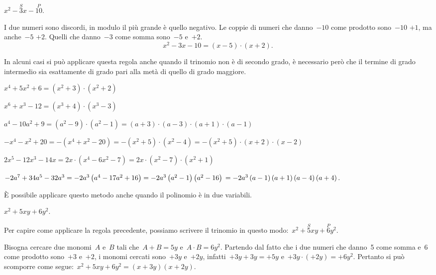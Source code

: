 \begin{esempio}
 $x^{2}-\overset{S}{3}x-\overset{P}{10}.$

I due numeri sono discordi, in modulo il più grande è quello
negativo. Le coppie di numeri che danno~$-10$ come prodotto sono~$-10$ $+1$,
ma anche~$-5$ $+2$. Quelli che danno~$-3$ come somma sono~$-5$ e~$+2$.
\[x^{2}-3x-10=\left(x-5\right)\cdot \left(x+2\right).\]
\end{esempio}

\begin{esempio}
 In alcuni casi si può applicare questa regola anche quando il trinomio
non è di secondo grado, è necessario però che il termine di grado
intermedio sia esattamente di grado pari alla metà di quello di grado
maggiore.

\begin{itemize*}
\item $x^{4}+5x^{2}+6=\left(x^{2}+3\right)\cdot \left(x^{2}+2\right)$
\item $x^{6}+x^{3}-12=\left(x^{3}+4\right)\cdot \left(x^{3}-3\right)$
\item $a^{4}-10a^{2}+9=\left(a^{2}-9\right)\cdot\left(a^{2}-1\right)=
       \left(a+3\right)\cdot \left(a-3\right)\cdot 
       \left(a+1\right)\cdot\left(a-1\right)$
\item $-x^{4}-x^{2}+20=-\left(x^{4}+x^{2}-20\right)=
       -\left(x^{2}+5\right)\cdot\left(x^{2}-4\right)=
       -\left(x^{2}+5\right)\cdot\left(x+2\right)\cdot \left(x-2\right)$
\item $2x^{5}-12x^{3}-14x=2x\cdot \left(x^{4}-6x^{2}-7\right)=2x\cdot%
\left(x^{2}-7\right)\cdot \left(x^{2}+1\right)$
\item $-2a^{7}+34a^{5}-32a^{3}=-2a^{3}\left(a^{4}-17a^{2}+16\right)
    =-2a^{3}\left(a^{2}-1\right)\left(a^{2}-16\right)\\
    =-2a^{3}\left(a-1\right)\left(a+1\right)\left(a-4\right)\left(a+4\right).$
\end{itemize*}
\end{esempio}


È possibile applicare questo metodo anche quando il
polinomio è in due variabili.

 \begin{esempio}
 $x^{2}+5xy+6y^{2}$.

 Per capire come applicare la regola precedente, possiamo scrivere il
trinomio in questo modo:~$x^{2}+\overset{S}{5}xy+\overset{P}{6}y{^{2}}$.

Bisogna cercare due monomi~$A$ e~$B$ tali che~$A+B=5y$
e~$A\cdot B=6y^{2}$. Partendo dal fatto che i due numeri che danno~5
come somma e~6 come prodotto sono~$+3$ e~$+2$, i monomi cercati 
sono~$+3y$ e~$+2y$, infatti~$+3y+3y=+5y$ e~$+3y\cdot (+2y)=+6y^{2}$. 
Pertanto si può scomporre come segue:~$x^{2}+5xy+6y^{2}=(x+3y)(x+2y)$.
 \end{esempio}

